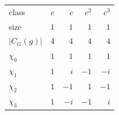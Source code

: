 \begin{tabular}{lrrrr}
\toprule
class & $e$ & $c$ & $c^2$ & $c^3$ \\
size & $1$ & $1$ & $1$ & $1$ \\
$|C_G(g)|$ & $4$ & $4$ & $4$ & $4$ \\
\midrule
$\chi_0$ & $1$ & $1$ & $1$ & $1$ \\
$\chi_1$ & $1$ & $i$ & $-1$ & $-i$ \\
$\chi_2$ & $1$ & $-1$ & $1$ & $-1$ \\
$\chi_3$ & $1$ & $-i$ & $-1$ & $i$ \\
\bottomrule
\end{tabular}
